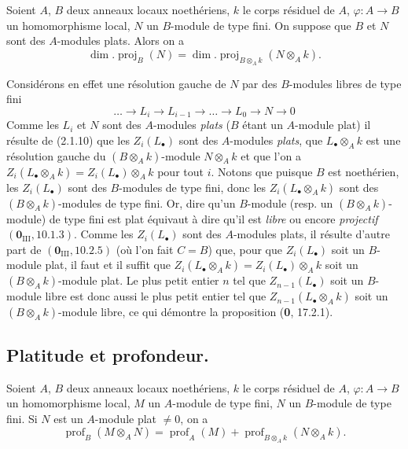 
\begin{proposition}[6.2.3]
Soient $A$, $B$ deux anneaux locaux noethériens, $k$ le corps résiduel de
$A$, $\varphi:A\to B$ un homomorphisme local, $N$ un $B$-module de type fini.
On suppose que $B$ et $N$ sont des $A$-modules plats. Alors on a
\begin{equation}
\dim.\operatorname{proj}_B(N)
=\dim.\operatorname{proj}_{B\otimes_Ak}(N\otimes_Ak).
\tag{6.2.3.1}\label{IV.2.s6.2.3.1-fr}
\end{equation}
\end{proposition}

Considérons en effet une résolution gauche de $N$ par des $B$-modules libres
de type fini
\[
\ldots\to L_i\to L_{i-1}\to\ldots\to L_0\to N\to0
\]
Comme les $L_i$ et $N$ sont des $A$-modules \emph{plats} ($B$ étant un $A$-module
plat) il résulte de (2.1.10) que les $Z_i(L_\bullet)$ sont des $A$-modules
\emph{plats}, que $L_\bullet\otimes_Ak$ est une résolution gauche du
$(B\otimes_Ak)$-module $N\otimes_Ak$ et que l'on a
$Z_i(L_\bullet\otimes_Ak)=Z_i(L_\bullet)\otimes_Ak$ pour tout $i$. Notons que
puisque $B$ est noethérien, les $Z_i(L_\bullet)$ sont des $B$-modules de type
fini, donc les $Z_i(L_\bullet\otimes_Ak)$ sont des $(B\otimes_Ak)$-modules de
type fini. Or, dire qu'un $B$-module (resp. un $(B\otimes_Ak)$-module) de type
fini est plat équivaut à dire qu'il est \emph{libre} ou encore \emph{projectif}
$(\mathbf{0}_{\mathrm{III}}, 10.1.3)$. Comme les $Z_i(L_\bullet)$ sont des $A$-modules
plats, il résulte d'autre part de $(\mathbf{0}_{\mathrm{III}}, 10.2.5)$ (où l'on fait
$C=B$) que, pour que $Z_i(L_\bullet)$ soit un $B$-module plat, il faut et il
suffit que $Z_i(L_\bullet\otimes_Ak)=Z_i(L_\bullet)\otimes_Ak$ soit un $(B\otimes_Ak)$-module plat. Le
plus petit entier $n$ tel que $Z_{n-1}(L_\bullet)$ soit un $B$-module libre est
donc aussi le plus petit entier tel que $Z_{n-1}(L_\bullet\otimes_Ak)$ soit un
$(B\otimes_Ak)$-module libre, ce qui démontre la proposition (\textbf{0}, 17.2.1).

\subsection{Platitude et profondeur.}

\begin{proposition}[6.3.1]
Soient $A$, $B$ deux anneaux locaux noethériens, $k$ le corps résiduel de
$A$, $\varphi:A\to B$ un homomorphisme local, $M$ un $A$-module de type fini,
$N$ un $B$-module de type fini. Si $N$ est un $A$-module plat $\neq0$, on a
\begin{equation}
\operatorname{prof}_B(M\otimes_AN)=\operatorname{prof}_A(M)
+\operatorname{prof}_{B\otimes_Ak}(N\otimes_Ak).
\tag{6.3.1.1}\label{IV.2.s6.3.1.1-fr}
\end{equation}
\end{proposition}

